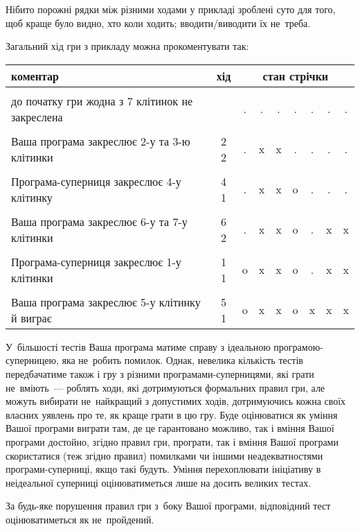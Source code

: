 \Note

Нібито порожні рядки між різними ходами у прикладі зроблені суто для того, щоб краще було видно, хто коли ходить; вводити/виводити їх не~треба.

Загальний хід гри з прикладу можна прокоментувати так: 

\begin{tabular}{lc|c|c|c|c|c|c|c|}
коментар
&
хід
&
\multicolumn{7}{c}{стан стрічки}
\\ \hline
\\ \hline
до початку гри жодна з 7 клітинок не закреслена
&  
& . & . & . & . & . & . & . 
\\ \hline
\\ \hline
Ваша програма закреслює 2-у та 3-ю клітинки
&
2 2
& . & x & x & . & . & . & .  
\\ \hline
\\ \hline
Програма-суперниця закреслює 4-у клітинку
&
4 1
& . & x & x & o & . & . & .  
\\ \hline
\\ \hline
Ваша програма закреслює 6-у та 7-у клітинки
&
6 2
& . & x & x & o & . & x & x  
\\ \hline
\\ \hline
Програма-суперниця закреслює 1-у клітинки
&
1 1
& o & x & x & o & . & x & x  
\\ \hline
\\ \hline
Ваша програма закреслює 5-у клітинку й виграє
&
5 1
& o & x & x & o & x & x & x  

\end{tabular}

\Scoring
У~більшості тестів Ваша програма матиме справу з ідеальною програмою-суперницею, яка не~робить помилок.
Однак, невелика кількість тестів передбачатиме також і гру з різними програмами-суперницями, які грати не~вміють~---  роблять ходи, які дотримуються формальних правил гри, 
але можуть вибирати не~найкращий з допустимих ходів, дотримуючись кожна своїх власних уявлень про те, як краще грати в цю гру.
Буде оцінюватися 
як уміння Вашої програми виграти там, де це гарантовано можливо,
так і вміння Вашої програми достойно, згідно правил гри, програти, 
так і вміння Вашої програми скористатися (теж згідно правил) помилками чи іншими неадекватностями програми-суперниці, якщо такі будуть.
Уміння перехоплювати ініціативу в неідеальної суперниці оцінюватиметься лише на досить великих тестах.

За будь-яке порушення правил гри з~боку Вашої програми, відповідний тест оцінюватиметься як не~пройдений.

